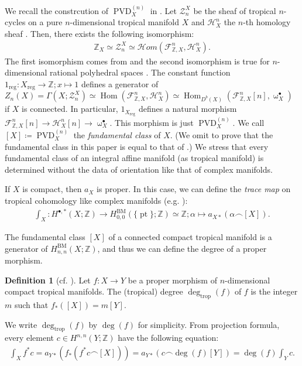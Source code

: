 \documentclass[a4paper,dvipdfmx,reqno,12pt]{amsart}
\theoremstyle{definition}
\newtheorem{definition}[theorem]{Definition}
\newcommand{\deq}{\coloneqq}
\newcommand{\opn}[1]{\operatorname{#1}}
\numberwithin{equation}{section}
\begin{document}
We recall the constrcution 
of $\opn{PVD}^{(n)}_X$ in \cite{gross2019sheaftheoretic}.
Let $\mathscr{Z}_n^{X}$ be the sheaf of tropical 
$n$-cycles \cite[Definition 3.5]{gross2019sheaftheoretic}
on a pure $n$-dimensional tropical manifold $X$ and 
$\mathcal{H}^{n}_X$ the $n$-th 
homology sheaf \cite[Definition 4.6]{gross2019sheaftheoretic}.
Then, there exists the following isomorphism:
\begin{align}
\mathbb{Z}_X \simeq\mathscr{Z}_n^{X}\simeq 
\mathcal{H}om(\mathcal{F}^{n}_{\mathbb{Z},X},
\mathcal{H}^{n}_X).
\end{align}
The first isomorphism comes from \cite[Lemma 2.4]{MR3041763} and
the second isomorphism is true for $n$-dimensional rational polyhedral 
spaces \cite[Proposition 5.1]{gross2019sheaftheoretic}.
The constant function
$1_{\opn{reg}}\colon X_{\opn{reg}} \to \mathbb{Z}; 
x\mapsto 1$ defines a generator of 
$Z_n(X)=\Gamma(X;\mathscr{Z}_n^{X})\simeq 
\opn{Hom}(\mathcal{F}^{n}_{\mathbb{Z},X},
\mathcal{H}^{n}_X)\simeq 
\opn{Hom}_{D^{b}(X)}(\mathcal{F}^{n}_{\mathbb{Z},X}[n],
\upomega_X^{\bullet})$ if $X$ is connected.
In particular, $1_{X_{\opn{reg}}}$ defines a 
natural morphism 
$\mathcal{F}^{n}_{\mathbb{Z},X}[n]\to \mathcal{H}^{n}_X[n] 
\to \upomega_X^{\bullet}$.
This morphism is just $\opn{PVD}^{(n)}_X$.
We call $[X]\deq \opn{PVD}_X^{(n)}$
the \emph{fundamental class} of $X$.
(We omit to prove that the fundamental class in this 
paper is equal to that of 
\cite[Definition 4.8]{MR3894860}.)
We stress that every fundamental class of an integral affine 
manifold (as tropical manifold) 
is determined without the data of orientation
like that of complex manifolds.

If $X$ is compact, then $a_{X}$ is proper. 
In this case,
we can define the \emph{trace map} 
on tropical cohomology like complex manifolds 
(e.g. \cite[Example 13.A.3]{MR2810322}):
\begin{align} 
\label{equation-trace-integration}
\int_X \colon H^{\bullet,*}(X;\mathbb{Z})\to 
H_{0,0}^{\opn{BM}}(\{\opn{pt}\};\mathbb{Z})\simeq 
\mathbb{Z}; \alpha \mapsto a_{X*}(\alpha \frown [X]).
\end{align}

The fundamental class $[X]$ of a connected compact
tropical manifold is a generator of 
$H_{n,n}^{\opn{BM}}(X;\mathbb{Z})$, and thus we 
can define the degree of a proper morphism.
\begin{definition}[{cf. \cite[Definition 2.11]{MR3668972}}]
Let $f\colon X \to Y$ be a proper morphism of 
$n$-dimensional compact tropical manifolds.
The (tropical) degree $\opn{deg}_{\opn{trop}}(f)$ of $f$ is the integer $m$
such that $f_*([X])=m[Y]$. 
\end{definition}
We write $\opn{deg}_{\opn{trop}}(f)$ by $\opn{deg}(f)$
for simplicity.
From projection formula, every element 
$c\in H^{n,n}(Y;\mathbb{Z})$ have the following equation:
\begin{align}
\int_{X}f^{*}c
=a_{Y*}(f_*(f^{*}c\frown [X]))
=a_{Y*}(c\frown \opn{deg}(f)[Y])
=\opn{deg}(f)\int_Y c.
\end{align}
\end{document}
